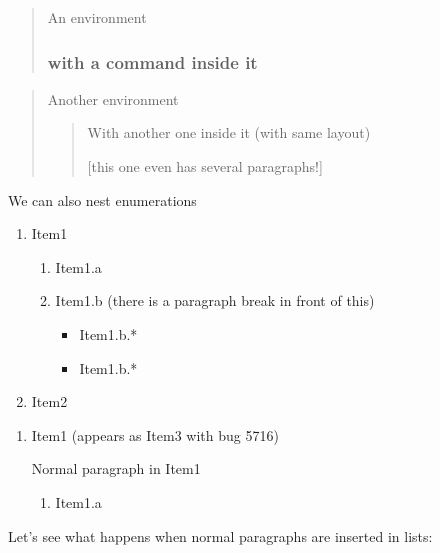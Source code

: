 \documentclass[legalpaper]{article}
\begin{document}
\begin{quotation}
An environment

\subsubsection*{with a command inside it}
\end{quotation}

\begin{quotation}
Another environment

\begin{quotation}
With another one inside it (with same layout)

[this one even has several paragraphs!]
\end{quotation}

\end{quotation}

We can also nest enumerations

\begin{enumerate}
\item Item1
\begin{enumerate}
\item Item1.a

\item Item1.b (there is  a paragraph break in front of this)
\begin{itemize}
\item Item1.b.*
\item Item1.b.*
\end{itemize}
\end{enumerate}
\item Item2
\end{enumerate}
\begin{enumerate}
\item Item1 (appears as Item3 with bug 5716)

Normal paragraph in Item1

\begin{enumerate}
\item Item1.a
\end{enumerate}
\end{enumerate}

Let's see what happens when normal paragraphs are inserted in lists:
\end{document}
